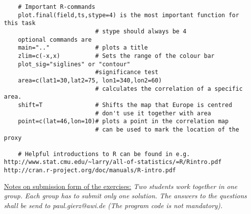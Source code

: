 \documentclass[a4paper,12pt]{article}
\begin{document}
\begin{verbatim}
	# Important R-commands
	plot.final(field,ts,stype=4) is the most important function for this task
	                      # stype should always be 4
	optional commands are
	main=".."             # plots a title
	zlim=c(-x,x)          # Sets the range of the colour bar
	plot_sig="siglines" or "contour"
	                      #significance test
	area=c(lat1=30,lat2=75, lon1=340,lon2=60)
	                      # calculates the correlation of a specific area. 
	shift=T               # Shifts the map that Europe is centred 
	                      # don't use it together with area
	point=c(lat=46,lon=10)# plots a point in the correlation map
	                      # can be used to mark the location of the proxy

	# Helpful introductions to R can be found in e.g.
http://www.stat.cmu.edu/~larry/all-of-statistics/=R/Rintro.pdf
http://cran.r-project.org/doc/manuals/R-intro.pdf
\end{verbatim}
\underline{Notes on submission form of the exercises:}
 \textit{Two students work together in one group. Each group has to submit only one solution. The answers to the questions shall be send to paul.gierz@awi.de (The program code is not mandatory).
}
\end{document}

